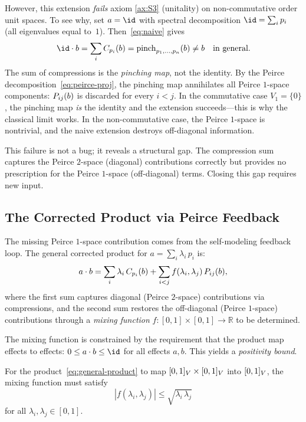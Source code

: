 \documentclass[11pt]{article}
\begin{document}
However, this extension \emph{fails} axiom \ref{ax:S3} (unitality)
on non-commutative order unit spaces.  To see why, set $a = \id$ with
spectral decomposition $\id = \sum_{i} p_{i}$ (all eigenvalues equal
to~$1$).  Then~\eqref{eq:naive} gives
\begin{equation}\label{eq:naive-failure}
  \sp{\id}{b}
  = \sum_{i} \comp{p_{i}}(b)
  = \pinch_{p_{1}, \ldots, p_{n}}(b)
  \neq b
  \quad\text{in general.}
\end{equation}
The sum of compressions is the \emph{pinching map}, not the identity.
By the Peirce decomposition~\eqref{eq:peirce-proj}, the pinching map
annihilates all Peirce $1$-space components: $P_{ij}(b)$ is
discarded for every $i < j$.  In the commutative case
$V_{1} = \{0\}$, the pinching map \emph{is} the identity and the
extension succeeds---this is why the classical limit works.  In the
non-commutative case, the Peirce $1$-space is nontrivial, and the
naive extension destroys off-diagonal information.

This failure is not a bug; it reveals a structural gap.  The
compression sum captures the Peirce $2$-space (diagonal) contributions
correctly but provides no prescription for the Peirce $1$-space
(off-diagonal) terms.  Closing this gap requires new input.


\subsection{The Corrected Product via Peirce Feedback}
\label{sec:sp-corrected}

The missing Peirce $1$-space contribution comes from the self-modeling
feedback loop.  The general corrected product for
$a = \sum_{i} \lambda_{i}\, p_{i}$ is:
\begin{equation}\label{eq:general-product}
  a \mathbin{\cdot} b
  = \sum_{i} \lambda_{i}\, C_{p_{i}}(b)
  + \sum_{i < j} f(\lambda_{i}, \lambda_{j})\, P_{ij}(b),
\end{equation}
where the first sum captures diagonal (Peirce $2$-space) contributions
via compressions, and the second sum restores the off-diagonal (Peirce
$1$-space) contributions through a \emph{mixing function}
$f: [0,1] \times [0,1] \to \mathbb{R}$ to be determined.

The mixing function is constrained by the requirement that the product
map effects to effects: $0 \leq \sp{a}{b} \leq \id$ for all effects
$a, b$.  This yields a \emph{positivity bound}.

\begin{proposition}\label{prop:pos-bound}
  For the product~\eqref{eq:general-product} to map
  $[0,1]_{V} \times [0,1]_{V}$ into $[0,1]_{V}$, the mixing function must
  satisfy
  \begin{equation}\label{eq:pos-bound}
    |f(\lambda_{i}, \lambda_{j})| \leq
    \sqrt{\lambda_{i}\, \lambda_{j}}
  \end{equation}
  for all $\lambda_{i}, \lambda_{j} \in [0,1]$.
\end{proposition}
\end{document}
